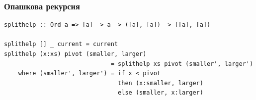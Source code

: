 \documentclass{beamer}
\begin{document}
\begin{frame}[fragile]
  \frametitle{Опашкова рекурсия}

\begin{lstlisting}[basicstyle=\ttfamily\tiny]
splithelp :: Ord a => [a] -> a -> ([a], [a]) -> ([a], [a])

splithelp [] _ current = current
splithelp (x:xs) pivot (smaller, larger) 
                              = splithelp xs pivot (smaller', larger')
    where (smaller', larger') = if x < pivot 
                                then (x:smaller, larger) 
                                else (smaller, x:larger)
\end{lstlisting}


\end{frame}



\end{document}
